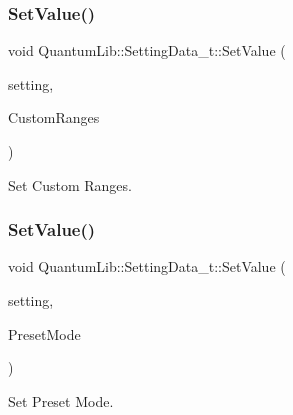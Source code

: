 \subsubsection{\texorpdfstring{Set\+Value()}{SetValue()}\hspace{0.1cm}{\footnotesize\ttfamily [11/26]}}
{\footnotesize\ttfamily void Quantum\+Lib\+::\+Setting\+Data\+\_\+t\+::\+Set\+Value (\begin{DoxyParamCaption}\item[{\mbox{\hyperlink{namespace_quantum_lib_acc8124e3e65bca4aa798d03a55e3d54c}{e\+Settings\+\_\+t}}}]{setting,  }\item[{\mbox{\hyperlink{struct_quantum_lib_1_1_custom_ranges__t}{Custom\+Ranges\+\_\+t}} \&}]{Custom\+Ranges }\end{DoxyParamCaption})\hspace{0.3cm}{\ttfamily [inline]}}



Set Custom Ranges. 

\mbox{\label{struct_quantum_lib_1_1_setting_data__t_ab29818ab5e44fe740beb1745c6049720}} 
\subsubsection{\texorpdfstring{Set\+Value()}{SetValue()}\hspace{0.1cm}{\footnotesize\ttfamily [12/26]}}
{\footnotesize\ttfamily void Quantum\+Lib\+::\+Setting\+Data\+\_\+t\+::\+Set\+Value (\begin{DoxyParamCaption}\item[{\mbox{\hyperlink{namespace_quantum_lib_acc8124e3e65bca4aa798d03a55e3d54c}{e\+Settings\+\_\+t}}}]{setting,  }\item[{\mbox{\hyperlink{namespace_quantum_lib_a74d29df2264e3cb8e03e70007c7152f8}{e\+Preset\+\_\+t}}}]{Preset\+Mode }\end{DoxyParamCaption})\hspace{0.3cm}{\ttfamily [inline]}}



Set Preset Mode. 

\mbox{\label{struct_quantum_lib_1_1_setting_data__t_a2092a8fe47c6909fd43ec6a900d75ca8}} 
